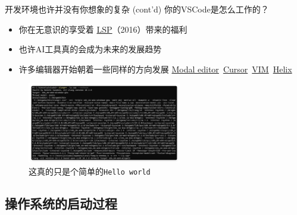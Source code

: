 \documentclass[aspectratio=1610]{beamer}
\begin{document}
\begin{frame}[t]{开发环境也许并没有你想象的复杂 (cont'd)}
    你的VSCode是怎么工作的？
    \begin{center}
        \begin{itemize}
            \item 你在无意识的享受着 \href{https://en.wikipedia.org/wiki/Language_Server_Protocol}{\alert{LSP}}（2016）带来的福利
            \item 也许AI工具真的会成为未来的发展趋势
            \item 许多编辑器开始朝着一些同样的方向发展 \href{https://unix.stackexchange.com/questions/57705/what-is-a-modeless-vs-a-modal-editor}{Modal editor}\ \href{https://www.cursor.com/}{Cursor}\ \href{https://www.vim.org/}{VIM}\ \href{https://helix-editor.com/}{Helix}
        \end{itemize}
    \end{center}
    \begin{figure}
        \centering
        \includegraphics[width=0.6\textwidth]{pic/compile.png}
        \caption{这真的只是个简单的\texttt{Hello world}}
    \end{figure}
\end{frame}

\subsection{操作系统的启动过程}
\end{document}
